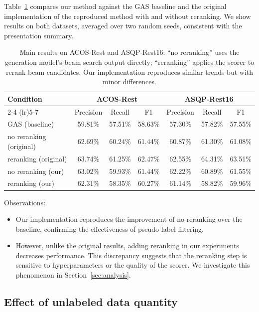 \documentclass{article}
\begin{document}
Table~\ref{tab:main} compares our method against the GAS baseline and the original implementation of the reproduced method with and without reranking. We show results on both datasets, averaged over two random seeds, consistent with the presentation summary.

\begin{table}[t]
\centering
\begin{tabular}{lcccccc}
\toprule
\multirow{2}{*}{Condition} & \multicolumn{3}{c}{ACOS-Rest} & \multicolumn{3}{c}{ASQP-Rest16} \\
\cmidrule(lr){2-4} \cmidrule(lr){5-7}
 & Precision & Recall & F1 & Precision & Recall & F1 \\
\midrule
GAS (baseline) & 59.81\% & 57.51\% & 58.63\% & 57.30\% & 57.82\% & 57.55\% \\
no reranking (original) & 62.69\% & 60.24\% & 61.44\% & 60.87\% & 61.30\% & 61.08\% \\
reranking (original) & 63.74\% & 61.25\% & 62.47\% & 62.55\% & 64.31\% & 63.51\% \\
no reranking (our) & 63.02\% & 59.93\% & 61.44\% & 62.22\% & 60.89\% & 61.55\% \\
reranking (our) & 62.31\% & 58.35\% & 60.27\% & 61.14\% & 58.82\% & 59.96\% \\
\bottomrule
\end{tabular}
\caption{Main results on ACOS-Rest and ASQP-Rest16. ``no reranking'' uses the generation model's beam search output directly; ``reranking'' applies the scorer to rerank beam candidates. Our implementation reproduces similar trends but with minor differences.}
\label{tab:main}
\end{table}

Observations:
\begin{itemize}
    \item Our implementation reproduces the improvement of no-reranking over the baseline, confirming the effectiveness of pseudo-label filtering.
    \item However, unlike the original results, adding reranking in our experiments decreases performance. This discrepancy suggests that the reranking step is sensitive to hyperparameters or the quality of the scorer. We investigate this phenomenon in Section~\ref{sec:analysis}.
\end{itemize}

\subsection{Effect of unlabeled data quantity}
\label{sec:data_quantity}
\end{document}
